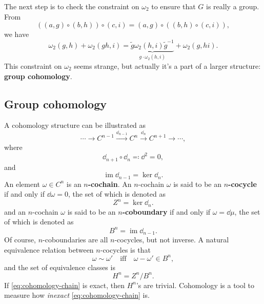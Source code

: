 \documentclass[hyperref, a4paper]{article}
\newcommand*{\concept}[1]{{\textbf{#1}}}
\DeclareMathOperator{\im}{im}
\begin{document}
The next step is to check the constraint on $\omega_2$ to ensure that $G$ is really a group. 
From 
\[
    ((a, g) \circ (b, h)) \circ (c, i) = (a, g) \circ ((b, h) \circ (c, i)),
\]
we have 
\begin{equation}
    \omega_2(g, h) + \omega_2(gh, i) = \underbrace{\tilde{g} \omega_2(h, i) \tilde{g}^{-1}}_{g \cdot \omega_2(h, i)} + \omega_2(g, hi).
    \label{eq:omega-consistent-condition}
\end{equation}
This constraint on $\omega_2$ seems strange, but actually it's a part of a larger structure: 
\concept{group cohomology}. 

\subsection{Group cohomology}

A cohomology structure can be illustrated as 
\begin{equation}
    \cdots \to C^{n-1} \stackrel{\dd_{n-1}}{\longrightarrow} C^n \stackrel{\dd_n}{\longrightarrow} C^{n+1} \to \cdots ,
    \label{eq:cohomology-chain}
\end{equation}
where 
\begin{equation}
    \dd_{n+1} \circ \dd_n \eqqcolon \dd^2 = 0,
\end{equation} 
and 
\begin{equation}
    \im \dd_{n-1} = \ker \dd_n.
\end{equation}
An element $\omega \in C^{n}$ is an \concept{$n$-cochain}. An $n$-cochain $\omega$ is said to be an 
\concept{$n$-cocycle} if and only if $\dd{\omega} = 0$, the set of which is denoted as
\begin{equation}
    Z^n = \ker \dd_n.
\end{equation}
and an $n$-cochain $\omega$ is said to be an 
\concept{$n$-coboundary} if and only if $\omega = \dd{\mu}$, the set of which is denoted as 
\begin{equation}
    B^n = \im \dd_{n-1}.
\end{equation}
Of course, $n$-coboundaries are all 
$n$-cocycles, but not inverse. A natural equivalence relation between $n$-cocycles is that 
\begin{equation}
    \omega \sim \omega' \quad \text{iff} \quad \omega - \omega' \in B^n,
\end{equation}
and the set of equivalence classes is 
\begin{equation}
    H^n = Z^n / B^n.
\end{equation}
If \eqref{eq:cohomology-chain} is exact, then $H^n$'s are trivial. Cohomology is a tool to measure how 
\emph{inexact} \eqref{eq:cohomology-chain} is.
\end{document}

